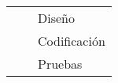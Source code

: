 \begin{landscape}
\begin{table}[ht]
\begin{tabular}{L{9cm}ll}
                                     &                                         & Diseño                                         \\ 
                                     &                                         & Codificación                                   \\ 
                                     &                                         & Pruebas                                        \\ \hline
\end{tabular}
\end{table}
\end{landscape}

%


%

